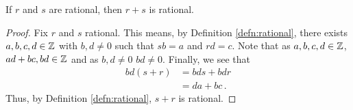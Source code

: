 \guard




\begin{prop}
\label{prop:sumOfRaionalsIsRational}
  If $r$ and $s$ are rational, then $r+s$ is rational.
\end{prop}
\begin{proof}
  Fix $r$ and $s$ rational.
  This means, by Definition \ref{defn:rational}, there exists $a,b,c,d\in\mathbb{Z}$ with $b,d\not=0$ such that $sb=a$ and $rd=c$.
  Note that as $a,b,c,d\in\mathbb{Z}$, $ad+bc,bd\in\mathbb{Z}$ and as $b,d\not=0$ $bd\not=0$.
  Finally, we see that
  \begin{align*}
    bd(s+r) &= bds + bdr \\
            &= da + bc\,.
  \end{align*}
  Thus, by Definition \ref{defn:rational}, $s+r$ is rational.
\end{proof}
